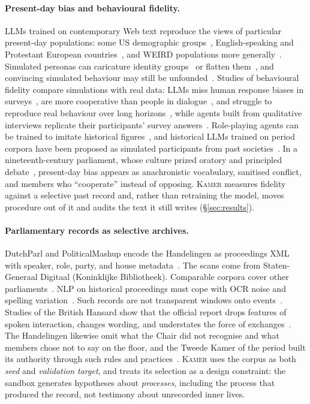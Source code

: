 \documentclass[sigconf,review,anonymous]{acmart}
\newcommand{\sys}{\textsc{Kamer}}
\begin{document}
\paragraph{Present-day bias and behavioural fidelity.} LLMs trained on
contemporary Web text reproduce the views of particular present-day
populations: some US demographic groups~\cite{santurkar2023opinions},
English-speaking and Protestant European
countries~\cite{tao2024cultural}, and WEIRD
populations more generally~\cite{atari2023which}. Simulated personas can
caricature identity groups~\cite{cheng2023compost} or flatten
them~\cite{wang2025identity}, and convincing simulated behaviour may
still be unfounded~\cite{ziems2024css}. Studies of behavioural fidelity
compare simulations with real data: LLMs miss human response biases in
surveys~\cite{tjuatja2024biases,bisbee2024synthetic}, are more cooperative
than people in dialogue~\cite{zhou2026sim2real}, and struggle
to reproduce real behaviour over long
horizons~\cite{li2025digitaltwins,chen2026traces,cheng2026longhorizon},
while agents built from qualitative interviews replicate their
participants' survey answers~\cite{park2024thousand}. Role-playing agents
can be trained to imitate historical figures~\cite{shao2023characterllm},
and historical LLMs trained on period corpora have been proposed as
simulated participants from past societies~\cite{varnum2024historical}. In a
nineteenth-century parliament, whose culture prized oratory and principled
debate~\cite{tevelde2015sprekende}, present-day bias appears as
anachronistic vocabulary, sanitised conflict, and members who
``cooperate'' instead of opposing. \sys{} measures fidelity against a
selective past record and, rather than retraining the model, moves
procedure out of it and audits the text it still writes
(\S\ref{sec:results}).

\paragraph{Parliamentary records as selective archives.} DutchParl and
PoliticalMashup encode the Handelingen as proceedings XML with speaker,
role, party, and house metadata~\cite{marx2010dutchparl,marx2012dutchparl}.
The scans come from Staten-Generaal Digitaal (Koninklijke Bibliotheek).
Comparable corpora cover other
parliaments~\cite{erjavec2023parlamint,rauh2020parlspeech}.
NLP on historical proceedings must cope with OCR noise and spelling variation~\cite{ehrmann2023ner}. Such
records are not transparent windows onto
events~\cite{trouillot1995silencing,stoler2009archival}. Studies of the
British Hansard show that the official report drops features of spoken
interaction, changes wording, and understates the force of
exchanges~\cite{slembrouck1992hansard,mollin2007hansard}.
The Handelingen likewise omit what the Chair did not recognise and what
members chose not to say on the floor, and the Tweede Kamer of the
period built its authority through such rules and
practices~\cite{turpijn2008mannen}. \sys{} uses the corpus as both
\emph{seed} and \emph{validation target}, and treats its selection as a
design constraint: the sandbox generates hypotheses about
\emph{processes}, including the process that produced the record, not
testimony about unrecorded inner lives.
\end{document}
